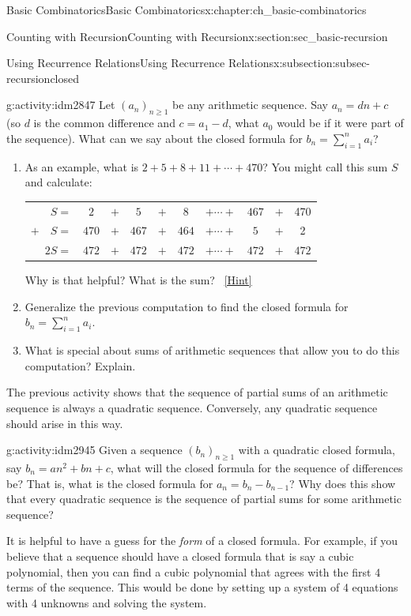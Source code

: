 \documentclass[oneside,10pt,]{book}
\numberwithin{equation}{chapter}
\newcommand{\hrulethin}  {\noalign{\hrule height 0.04em}}
\begin{document}
\begin{chapterptx}{Basic Combinatorics}{}{Basic Combinatorics}{}{}{x:chapter:ch_basic-combinatorics}
\begin{sectionptx}{Counting with Recursion}{}{Counting with Recursion}{}{}{x:section:sec_basic-recursion}
\begin{subsectionptx}{Using Recurrence Relations}{}{Using Recurrence Relations}{}{}{x:subsection:subsec-recursionclosed}
\begin{activity}{}{g:activity:idm2847}%
Let \((a_n)_{n \ge 1}\) be any arithmetic sequence.  Say \(a_n = dn + c\) (so \(d\) is the common difference and \(c = a_1 - d\), what \(a_0\) would be if it were part of the sequence).  What can we say about the closed formula for \(b_n = \sum_{i=1}^n a_i\)?%
\begin{enumerate}[font=\bfseries,label=(\alph*),ref=\alph*]
\item{}As an example, what is \(2+5+8+11+\cdots + 470\)?  You might call this sum \(S\) and calculate:%
\begin{sidebyside}{1}{0}{0}{0}%
\begin{sbspanel}{1}%
{\centering%
\begin{tabular}{rccccccccc}
\(S  =\)&\(2\)&\(+\)&\(5\)&\(+\)&\(8\)&\(+ \cdots +\)&\(467\)&\(+\)&470\tabularnewline[0pt]
\(+ \quad S  =\)&\(470\)&\(+\)&\(467\)&\(+\)&\(464\)&\(+ \cdots +\)&\(5\)&\(+\)&2\tabularnewline\hrulethin
\(2S  =\)&\(472\)&\(+\)&\(472\)&\(+\)&\(472\)&\(+ \cdots +\)&\(472\)&\(+\)&\(472\)
\end{tabular}
\par}
\end{sbspanel}%
\end{sidebyside}%
\par
Why is that helpful?  What is the sum?%
\qquad~\hfill{\tiny\hyperlink{g:hint:idm2935-back}{[Hint]}}\item{}Generalize the previous computation to find the closed formula for \(b_n = \sum_{i=1}^n a_i\).%
\item{}What is special about sums of arithmetic sequences that allow you to do this computation?  Explain.%
\end{enumerate}
\end{activity}
The previous activity shows that the sequence of partial sums of an arithmetic sequence is always a quadratic sequence.  Conversely, any quadratic sequence should arise in this way.%
\begin{activity}{}{g:activity:idm2945}%
Given a sequence \((b_n)_{n \ge 1}\) with a quadratic closed formula, say \(b_n = an^2 + bn + c\), what will the closed formula for the sequence of differences be?  That is, what is the closed formula for \(a_n = b_n - b_{n-1}\)?  Why does this show that every quadratic sequence is the sequence of partial sums for some arithmetic sequence?%
\end{activity}
It is helpful to have a guess for the \emph{form} of a closed formula.  For example, if you believe that a sequence should have a closed formula that is say a cubic polynomial, then you can find a cubic polynomial that agrees with the first 4 terms of the sequence.  This would be done by setting up a system of 4 equations with 4 unknowns and solving the system.%

\end{subsectionptx}
\end{sectionptx}
\end{chapterptx}
\end{document}
